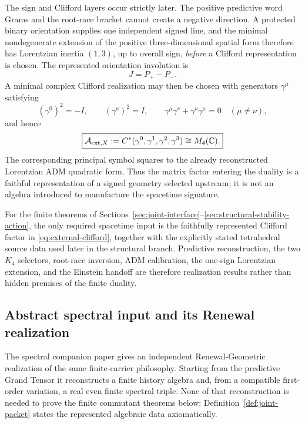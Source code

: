 \documentclass[11pt]{article}
\theoremstyle{definition}
\theoremstyle{remark}
\newcommand{\C}{\mathbb C}
\newcommand{\A}{\mathcal A}
\begin{document}
The sign and Clifford layers occur strictly later.  The positive predictive
word Grams and the root-race bracket cannot create a negative direction.  A
protected binary orientation supplies one independent signed line, and the
minimal nondegenerate extension of the positive three-dimensional spatial form
therefore has Lorentzian inertia $(1,3)$, up to overall sign, \emph{before} a
Clifford representation is chosen.  The represented orientation involution is
\[
J=P_+-P_-.
\]
A minimal complex Clifford realization may then be chosen with generators
$\gamma^\mu$ satisfying
\[
(\gamma^0)^2=-I,
\qquad
(\gamma^a)^2=I,
\qquad
\gamma^\mu\gamma^\nu+\gamma^\nu\gamma^\mu=0
\quad(\mu\ne\nu),
\]
and hence
\begin{equation}
\boxed{
\A_{{\rm ext},X}
:=
C^*(\gamma^0,\gamma^1,\gamma^2,\gamma^3)
\cong M_4(\C).}
\label{eq:external-clifford}
\end{equation}
The corresponding principal symbol squares to the already reconstructed
Lorentzian ADM quadratic form.  Thus the matrix factor entering the duality is
a faithful representation of a signed geometry selected upstream; it is not an
algebra introduced to manufacture the spacetime signature.

For the finite theorems of
Sections~\ref{sec:joint-interface}--\ref{sec:structural-stability-action}, the
only required spacetime input is the faithfully represented Clifford factor in
\eqref{eq:external-clifford}, together with the explicitly stated tetrahedral
source data used later in the structural branch.  Predictive reconstruction,
the two $K_4$ selectors, root-race inversion, ADM calibration, the one-sign
Lorentzian extension, and the Einstein handoff are therefore realization
results rather than hidden premises of the finite duality.

\subsection{Abstract spectral input and its Renewal realization}

The spectral companion paper \cite{PelissierSpectral2026} gives an independent
Renewal-Geometric realization of the same finite-carrier philosophy.  Starting
from the predictive Grand Tensor it reconstructs a finite history algebra and,
from a compatible first-order variation, a real even finite spectral triple.
None of that reconstruction is needed to prove the finite commutant theorems
below: Definition~\ref{def:joint-packet} states the represented algebraic data
axiomatically.
\end{document}
